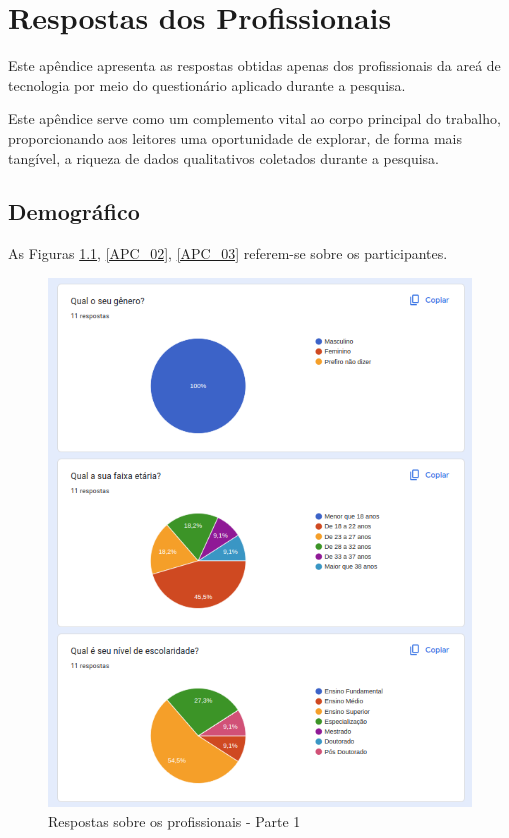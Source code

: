 \chapter{Respostas dos Profissionais}\label{respostas_dos_profissionais}

Este apêndice apresenta as respostas obtidas apenas dos profissionais da areá de tecnologia por meio do questionário aplicado durante a pesquisa. 

Este apêndice serve como um complemento vital ao corpo principal do trabalho, proporcionando aos leitores uma oportunidade de explorar, de forma mais tangível, a riqueza de dados qualitativos coletados durante a pesquisa.

\newpage

\section{Demográfico}

As Figuras \ref{APC_01}, \ref{APC_02}, \ref{APC_03} referem-se sobre os participantes.

\begin{figure}[!h]
	\begin{center}
	    \includegraphics[scale=0.7]{figs/Answers/Professionals/01.png}
	\end{center}
	\caption{\label{APC_01}Respostas sobre os profissionais - Parte 1}
\end{figure}

